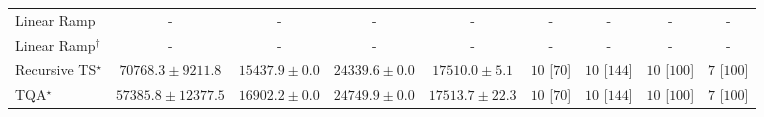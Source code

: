 \begin{tabular}{l|cccc|cccc|}
Linear Ramp & {\cellcolor[HTML]{000000}} \color[HTML]{F1F1F1} {\cellcolor{white}} \color{black} - & {\cellcolor[HTML]{000000}} \color[HTML]{F1F1F1} {\cellcolor{white}} \color{black} - & {\cellcolor[HTML]{000000}} \color[HTML]{F1F1F1} {\cellcolor{white}} \color{black} - & {\cellcolor[HTML]{000000}} \color[HTML]{F1F1F1} {\cellcolor{white}} \color{black} - & {\cellcolor[HTML]{000000}} \color[HTML]{F1F1F1} {\cellcolor{white}} \color{black} - & {\cellcolor[HTML]{000000}} \color[HTML]{F1F1F1} {\cellcolor{white}} \color{black} - & {\cellcolor[HTML]{000000}} \color[HTML]{F1F1F1} {\cellcolor{white}} \color{black} - & {\cellcolor[HTML]{000000}} \color[HTML]{F1F1F1} {\cellcolor{white}} \color{black} - \\
Linear Ramp$^\dagger$ & {\cellcolor[HTML]{000000}} \color[HTML]{F1F1F1} {\cellcolor{white}} \color{black} - & {\cellcolor[HTML]{000000}} \color[HTML]{F1F1F1} {\cellcolor{white}} \color{black} - & {\cellcolor[HTML]{000000}} \color[HTML]{F1F1F1} {\cellcolor{white}} \color{black} - & {\cellcolor[HTML]{000000}} \color[HTML]{F1F1F1} {\cellcolor{white}} \color{black} - & {\cellcolor[HTML]{000000}} \color[HTML]{F1F1F1} {\cellcolor{white}} \color{black} - & {\cellcolor[HTML]{000000}} \color[HTML]{F1F1F1} {\cellcolor{white}} \color{black} - & {\cellcolor[HTML]{000000}} \color[HTML]{F1F1F1} {\cellcolor{white}} \color{black} - & {\cellcolor[HTML]{000000}} \color[HTML]{F1F1F1} {\cellcolor{white}} \color{black} - \\
Recursive TS$^\star$ & {\cellcolor[HTML]{004C2C}} \color[HTML]{F1F1F1} $70768.3\pm 9211.8$ & {\cellcolor[HTML]{C3E698}} \color[HTML]{000000} $15437.9\pm 0.0$ & {\cellcolor[HTML]{9AD587}} \color[HTML]{000000} $24339.6\pm 0.0$ & {\cellcolor[HTML]{B9E294}} \color[HTML]{000000} $17510.0\pm 5.1$ & {\cellcolor[HTML]{49006A}} \color[HTML]{F1F1F1} $10$ [$70$] & {\cellcolor[HTML]{49006A}} \color[HTML]{F1F1F1} $10$ [$144$] & {\cellcolor[HTML]{49006A}} \color[HTML]{F1F1F1} $10$ [$100$] & {\cellcolor[HTML]{CD238F}} \color[HTML]{F1F1F1} $7$ [$100$] \\
TQA$^\star$ & {\cellcolor[HTML]{11753D}} \color[HTML]{F1F1F1} $57385.8\pm 12377.5$ & {\cellcolor[HTML]{BCE395}} \color[HTML]{000000} $16902.2\pm 0.0$ & {\cellcolor[HTML]{97D385}} \color[HTML]{000000} $24749.9\pm 0.0$ & {\cellcolor[HTML]{B9E294}} \color[HTML]{000000} $17513.7\pm 22.3$ & {\cellcolor[HTML]{49006A}} \color[HTML]{F1F1F1} $10$ [$70$] & {\cellcolor[HTML]{49006A}} \color[HTML]{F1F1F1} $10$ [$144$] & {\cellcolor[HTML]{49006A}} \color[HTML]{F1F1F1} $10$ [$100$] & {\cellcolor[HTML]{CD238F}} \color[HTML]{F1F1F1} $7$ [$100$] \\

\end{tabular}
